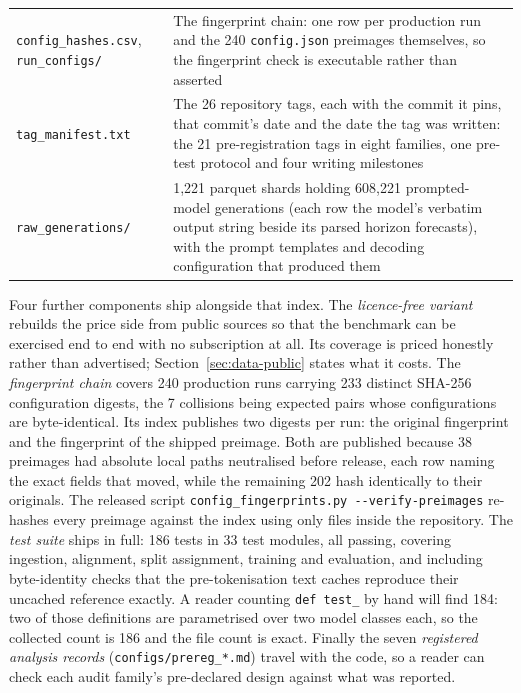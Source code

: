 \begin{table}[htbp]
\begin{tabular}{lp{9.4cm}}
    \texttt{config\_hashes.csv}, \texttt{run\_configs/} & The fingerprint chain: one row per production run and the 240 \texttt{config.json} preimages themselves, so the fingerprint check is executable rather than asserted \\ %
    \texttt{tag\_manifest.txt} & The 26 repository tags, each with the commit it pins, that commit's date and the date the tag was written: the 21 pre-registration tags in eight families, one pre-test protocol and four writing milestones \\ %
    \texttt{raw\_generations/} & 1{,}221 parquet shards holding 608{,}221 prompted-model generations (each row the model's verbatim output string beside its parsed horizon forecasts), with the prompt templates and decoding configuration that produced them \\ %
    \bottomrule
  \end{tabular}
\end{table}

Four further components ship alongside that index. The \emph{licence-free
variant} rebuilds the price side from public sources so that the benchmark can be
exercised end to end with no subscription at all. Its coverage is priced honestly
rather than advertised; Section~\ref{sec:data-public} states what it costs.
The \emph{fingerprint chain} covers 240 production runs carrying 233 distinct
SHA-256 configuration digests, the 7 collisions being expected pairs whose
configurations are byte-identical. %
Its index publishes two digests per run: the original fingerprint and the
fingerprint of the shipped preimage. Both are published because 38 preimages had
absolute local paths neutralised before release, each row naming the exact
fields that moved, while the remaining 202 hash identically to their originals. The released script
\texttt{config\_fingerprints.py -{}-verify-preimages} re-hashes every preimage
against the index using only files inside the repository. %
The \emph{test suite} ships in full: 186 tests in 33 test modules, all passing, covering
ingestion, alignment, split assignment, training and evaluation, and including
byte-identity checks that the pre-tokenisation text caches reproduce their
uncached reference exactly. A reader counting \texttt{def test\_} by hand will
find 184: two of those definitions are parametrised over two model classes each,
so the collected count is 186 and the file count is
exact. %
Finally the seven \emph{registered analysis records} (\texttt{configs/prereg\_*.md})
travel with the code, so a reader can check each audit family's pre-declared
design against what was reported. %

